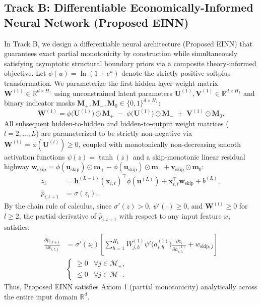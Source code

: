 \documentclass[pdflatex,sn-mathphys-num,twocolumn]{sn-jnl}
\theoremstyle{thmstyleone}
\theoremstyle{thmstyletwo}
\theoremstyle{thmstylethree}
\begin{document}
\subsection{Track B: Differentiable Economically-Informed Neural Network (Proposed EINN)}
In Track B, we design a differentiable neural architecture (Proposed EINN) that guarantees exact partial monotonicity by construction while simultaneously satisfying asymptotic structural boundary priors via a composite theory-informed objective. Let $\phi(u) = \ln(1 + e^u)$ denote the strictly positive softplus transformation. We parameterize the first hidden layer weight matrix $\mathbf{W}^{(1)} \in \mathbb{R}^{d \times H_1}$ using unconstrained latent parameters $\mathbf{U}^{(1)}, \mathbf{V}^{(1)} \in \mathbb{R}^{d \times H_1}$ and binary indicator masks $\mathbf{M}_+, \mathbf{M}_-, \mathbf{M}_0 \in \{0,1\}^{d \times H_1}$:
\begin{equation}
    \mathbf{W}^{(1)} = \phi\big(\mathbf{U}^{(1)}\big) \odot \mathbf{M}_+ \;-\; \phi\big(\mathbf{U}^{(1)}\big) \odot \mathbf{M}_- \;+\; \mathbf{V}^{(1)} \odot \mathbf{M}_0.
    \label{eq:einn_w1}
\end{equation}
All subsequent hidden-to-hidden and hidden-to-output weight matrices ($l = 2,\dots,L$) are parameterized to be strictly non-negative via $\mathbf{W}^{(l)} = \phi(\mathbf{U}^{(l)}) \ge 0$, coupled with monotonically non-decreasing smooth activation functions $\psi(z) = \tanh(z)$ and a skip-monotonic linear residual highway $\mathbf{w}_{\text{skip}} = \phi(\mathbf{u}_{\text{skip}}) \odot \mathbf{m}_+ - \phi(\mathbf{u}_{\text{skip}}) \odot \mathbf{m}_- + \mathbf{v}_{\text{skip}} \odot \mathbf{m}_0$:
\begin{align}
    z_i &= \mathbf{h}^{(L-1)}(\mathbf{x}_{i,t})^\top \phi(\mathbf{u}^{(L)}) + \mathbf{x}_{i,t}^\top \mathbf{w}_{\text{skip}} + b^{(L)}, \\
    \hat{p}_{i,t+1} &= \sigma(z_i).
\end{align}
By the chain rule of calculus, since $\sigma'(z) > 0$, $\psi'(\cdot) \ge 0$, and $\mathbf{W}^{(l)} \ge 0$ for $l \ge 2$, the partial derivative of $\hat{p}_{i,t+1}$ with respect to any input feature $x_j$ satisfies:
\begin{equation}
\begin{aligned}
    \frac{\partial \hat{p}_{i,t+1}}{\partial x_{i,t,j}} &= \sigma'(z_i)\left[ \sum_{h=1}^{H_1} W_{j,h}^{(1)} \psi'\big(a_{i,h}^{(1)}\big) \frac{\partial z_i}{\partial h_{i,h}^{(1)}} + w_{\text{skip},j} \right] \\
    &\begin{cases}
        \ge 0 & \forall j \in \mathcal{M}_+, \\
        \le 0 & \forall j \in \mathcal{M}_-.
    \end{cases}
\end{aligned}
\end{equation}
Thus, Proposed EINN satisfies Axiom 1 (partial monotonicity) analytically across the entire input domain $\mathbb{R}^d$.
\end{document}
